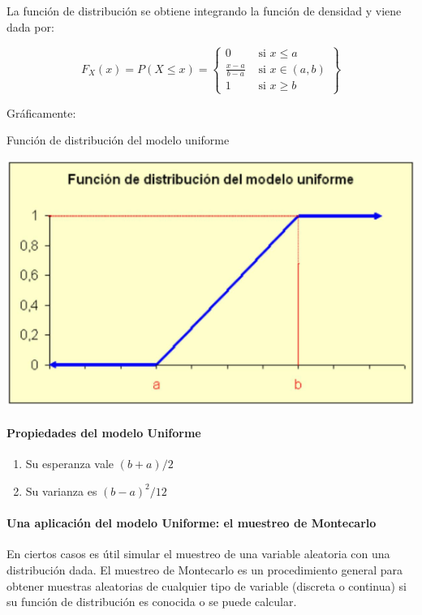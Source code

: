 \documentclass[
]{article}
\providecommand{\tightlist}{%
  \setlength{\itemsep}{0pt}\setlength{\parskip}{0pt}}
\begin{document}
La función de distribución se obtiene integrando la función de densidad y viene dada por:

\[
F_{X}(x)=P(X \leq x)=\left\{\begin{array}{ll}
0 & \text { si } x \leq a \\
\frac{x-a}{b-a} & \text { si } x \in(a, b) \\
1 & \text { si } x \geq b
\end{array}\right\}
\]

Gráficamente:

Función de distribución del modelo uniforme

\includegraphics[width=0.8\linewidth]{images/cdfUnifContinua}

\paragraph{Propiedades del modelo Uniforme}\label{propiedades-del-modelo-uniforme}

\begin{enumerate}
\def\labelenumi{\arabic{enumi}.}
\tightlist
\item
  Su esperanza vale \((b+a) / 2\)
\item
  Su varianza es \((b-a)^{2} / 12\)
\end{enumerate}

\paragraph{Una aplicación del modelo Uniforme: el muestreo de Montecarlo}\label{una-aplicaciuxf3n-del-modelo-uniforme-el-muestreo-de-montecarlo}

En ciertos casos es útil simular el muestreo de una variable aleatoria con una distribución dada. El muestreo de Montecarlo es un procedimiento general para obtener muestras aleatorias de cualquier tipo de variable (discreta o continua) si su función de distribución es conocida o se puede calcular.
\end{document}
